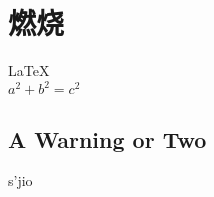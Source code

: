 \documentclass[UTF8]{article}
\begin{document}
       
 
\section{燃烧}          
\LaTeX \,\\ 
 $a^2+b^2=c^2$
 
\subsection{A Warning or Two}  

s'jio
\end{document}

